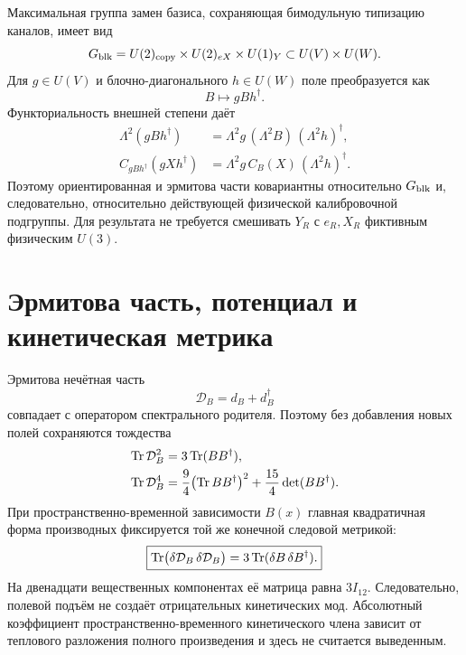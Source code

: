 Максимальная группа замен базиса, сохраняющая бимодульную типизацию
каналов, имеет вид
\begin{equation}
 G_{\rm blk}=U(2)_{\rm copy}\times U(2)_{eX}\times U(1)_Y
 \subset U(V)\times U(W).
 \label{eq:v7-field-superconnection-block-group}
\end{equation}
Для $g\in U(V)$ и блочно-диагонального $h\in U(W)$ поле преобразуется как
\begin{equation}
 B\longmapsto gBh^\dagger.
 \label{eq:v7-field-superconnection-field-action}
\end{equation}
Функториальность внешней степени даёт
\begin{align}
 \Lambda^2(gBh^\dagger)
 &=\Lambda^2g\,(\Lambda^2B)\,(\Lambda^2h)^\dagger,\\
 C_{gBh^\dagger}(gXh^\dagger)
 &=\Lambda^2g\,C_B(X)\,(\Lambda^2h)^\dagger.
 \label{eq:v7-field-superconnection-covariance}
\end{align}
Поэтому ориентированная и эрмитова части ковариантны относительно
$G_{\rm blk}$ и, следовательно, относительно действующей физической
калибровочной подгруппы. Для результата не требуется смешивать $Y_R$ с
$e_R,X_R$ фиктивным физическим $U(3)$.

\section{Эрмитова часть, потенциал и кинетическая метрика}

Эрмитова нечётная часть
\begin{equation}
 \mathcal D_B=d_B+d_B^\dagger
 \label{eq:v7-field-superconnection-hermitian-part}
\end{equation}
совпадает с оператором спектрального родителя. Поэтому без добавления
новых полей сохраняются тождества
\begin{align}
 \operatorname{Tr}\mathcal D_B^2&=3\operatorname{Tr}(BB^\dagger),\\
 \operatorname{Tr}\mathcal D_B^4&=\frac94\bigl(\operatorname{Tr} BB^\dagger\bigr)^2
 +\frac{15}{4}\det(BB^\dagger).
 \label{eq:v7-field-superconnection-finite-traces}
\end{align}
При пространственно-временной зависимости $B(x)$ главная квадратичная
форма производных фиксируется той же конечной следовой метрикой:
\begin{equation}
 \boxed{
 \operatorname{Tr}\bigl(\delta\mathcal D_B\,\delta\mathcal D_B\bigr)
 =3\operatorname{Tr}(\delta B\,\delta B^\dagger).}
 \label{eq:v7-field-superconnection-kinetic-metric}
\end{equation}
На двенадцати вещественных компонентах её матрица равна $3I_{12}$.
Следовательно, полевой подъём не создаёт отрицательных кинетических мод.
Абсолютный коэффициент пространственно-временного кинетического члена
зависит от теплового разложения полного произведения и здесь не считается
выведенным.

